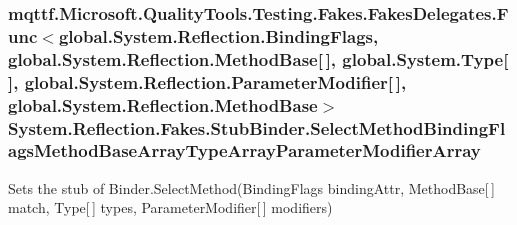 \hypertarget{class_system_1_1_reflection_1_1_fakes_1_1_stub_binder_a2059a1067c17f75f69217790578cc8a5}{
\subsubsection[{Select\-Method\-Binding\-Flags\-Method\-Base\-Array\-Type\-Array\-Parameter\-Modifier\-Array}]{\setlength{\rightskip}{0pt plus 5cm}mqttf.\-Microsoft.\-Quality\-Tools.\-Testing.\-Fakes.\-Fakes\-Delegates.\-Func$<$global.\-System.\-Reflection.\-Binding\-Flags, global.\-System.\-Reflection.\-Method\-Base\mbox{[}$\,$\mbox{]}, global.\-System.\-Type\mbox{[}$\,$\mbox{]}, global.\-System.\-Reflection.\-Parameter\-Modifier\mbox{[}$\,$\mbox{]}, global.\-System.\-Reflection.\-Method\-Base$>$ System.\-Reflection.\-Fakes.\-Stub\-Binder.\-Select\-Method\-Binding\-Flags\-Method\-Base\-Array\-Type\-Array\-Parameter\-Modifier\-Array}}\label{class_system_1_1_reflection_1_1_fakes_1_1_stub_binder_a2059a1067c17f75f69217790578cc8a5}


Sets the stub of Binder.\-Select\-Method(\-Binding\-Flags binding\-Attr, Method\-Base\mbox{[}$\,$\mbox{]} match, Type\mbox{[}$\,$\mbox{]} types, Parameter\-Modifier\mbox{[}$\,$\mbox{]} modifiers)

